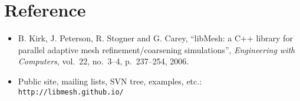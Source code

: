 \section*{Reference}
\begin{frame}[t]
  \begin{block}{}
    \begin{itemize}
    \item{
      B. Kirk, J. Peterson, R. Stogner and G. Carey, ``libMesh: a C++
      library for parallel adaptive mesh refinement/coarsening
      simulations'',  \emph{Engineering with Computers}, vol.~22, no.~3--4, p.~237--254, 2006.
      }
    \item{
      Public site, mailing lists, SVN tree, examples, etc.:
\texttt{http://libmesh.github.io/}
      }
    \end{itemize}
  \end{block}
\end{frame}
